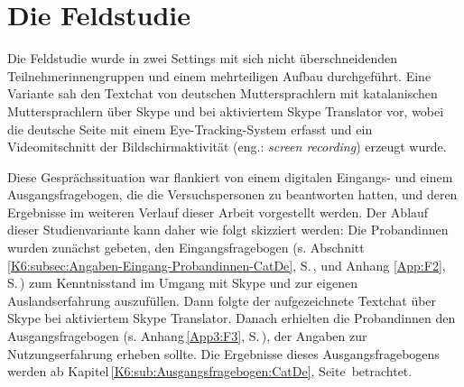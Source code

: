 

\section{Die Feldstudie}

\label{K5:sec:Feldstudie}


Die Feldstudie wurde in zwei Settings mit sich nicht überschneidenden Teilnehmer{\textperiodcentered}innengruppen und einem mehrteiligen Aufbau durchgeführt. Eine Variante sah den Textchat von deutschen Muttersprachlern mit katalanischen Muttersprachlern über Skype und bei aktiviertem Skype Translator vor, wobei die deutsche Seite mit einem Eye-Tracking-System erfasst und ein Videomitschnitt der Bildschirmaktivität (eng.: \emph{screen recording}) erzeugt wurde.

\begin{sloppypar}
Diese Gesprächssituation war flankiert von einem digitalen Eingangs- und einem Ausgangsfragebogen, die die Versuchspersonen zu beantworten hatten, und deren Ergebnisse im weiteren Verlauf dieser Arbeit vorgestellt werden.
Der Ablauf dieser Studienvariante kann daher wie folgt skizziert werden: Die Proband{\textperiodcentered}innen wurden zunächst gebeten, den Eingangsfragebogen (s. Abschnitt \ref{K6:subsec:Angaben-Eingang-Probandinnen-CatDe}, S.\,\pageref{K6:subsec:Angaben-Eingang-Probandinnen-CatDe}, und Anhang \ref{App:F2}, S.\,\pageref{App:F2}) zum Kenntnisstand im Umgang mit Skype und zur eigenen Auslandserfahrung auszufüllen. Dann folgte der aufgezeichnete Textchat über Skype bei aktiviertem Skype Translator. Danach erhielten die Proband{\textperiodcentered}innen den Ausgangsfragebogen (s. Anhang\,\ref{App3:F3}, S.\,\pageref{App3:F3}), der Angaben zur Nutzungserfahrung erheben sollte. Die Ergebnisse dieses Ausgangsfragebogens werden ab Kapitel\,\ref{K6:sub:Ausgangsfragebogen:CatDe}, Seite\,\pageref{K6:sub:Ausgangsfragebogen:CatDe} betrachtet. 
\end{sloppypar}

